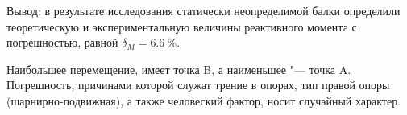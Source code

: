 Вывод: в результате исследования статически неопределимой балки определили теоретическую и экспериментальную величины реактивного момента с погрешностью, равной $\delta_M = 6.6~\%$.

Наибольшее перемещение, имеет точка B, а наименьшее "--- точка A.
Погрешность, причинами которой служат трение в опорах, тип правой опоры (шарнирно-подвижная), а также человеский фактор, носит случайный характер.
